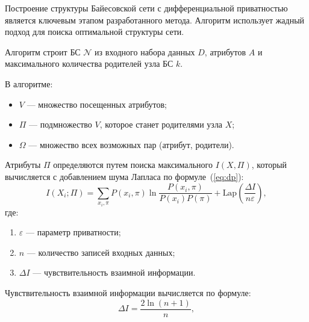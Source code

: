Построение структуры Байесовской сети с дифференциальной приватностью является ключевым этапом разработанного метода. Алгоритм использует жадный подход для поиска оптимальной структуры сети.

Алгоритм строит БС $\mathcal{N}$ из входного набора данных $D$, атрибутов $A$ и максимального количества родителей узла БС $k$. 

В алгоритме:
\begin{itemize}[label*=---]
	\item $V$ --- множество посещенных атрибутов;
	\item $\Pi$ --- подмножество $V$, которое станет родителями узла $X$;
	\item $\Omega$ --- множество всех возможных пар (атрибут, родители).
\end{itemize}

Атрибуты $\Pi$ определяются путем поиска максимального $I(X, \Pi)$, который вычисляется с добавлением шума Лапласа по формуле~(\ref{eq:dp}):
\begin{equation}\label{eq:dp}
	I(X_i; \Pi) = \sum_{x_i, \pi} P(x_i, \pi) \ln \frac{P(x_i, \pi)}{P(x_i) P(\pi)} + \text{Lap}\left(\frac{\Delta I}{n\varepsilon}\right),
\end{equation}
где:
\begin{enumerate}[label*=---]
	\item $\varepsilon$ --- параметр приватности;
	\item  $n$ --- количество записей входных данных;
	\item  $\Delta I$ --- чувствительность взаимной информации.
\end{enumerate}
Чувствительность взаимной информации вычисляется по формуле:
\begin{equation}
    \Delta I = \frac{2 \ln(n+1)}{n},
\end{equation}


	
